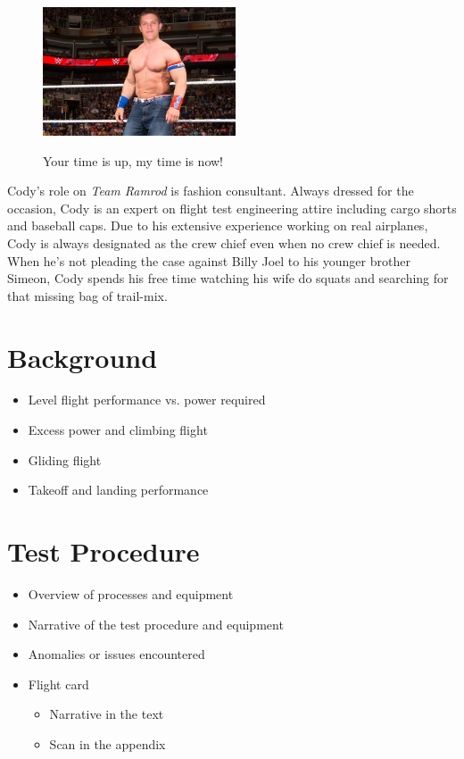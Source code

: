 \documentclass[conf]{new-aiaa}
\begin{document}
\begin{figure}[hbt!]
	\centering
	\includegraphics[height=1.5in]{CodyCena.jpg}
	\label{PAVSLOGO}
	\caption{Your time is up, my time is now!}
\end{figure}

Cody's role on \emph{Team Ramrod} is fashion consultant. Always dressed for the occasion, Cody is an expert on flight test engineering attire including cargo shorts and baseball caps. Due to his extensive experience working on real airplanes, Cody is always designated as the crew chief even when no crew chief is needed. When he's not pleading the case against Billy Joel to  his younger brother Simeon, Cody spends his free time watching his wife do squats and searching for that missing bag of trail-mix.


\section{Background}

\begin{itemize}
	\item Level flight performance vs. power required
	\item Excess power and climbing flight
	\item Gliding flight
	\item Takeoff and landing performance
\end{itemize}

\section{Test Procedure}

\begin{itemize}
	\item Overview of processes and equipment
	\item Narrative of the test procedure and equipment
	\item Anomalies or issues encountered
	\item Flight card
	\begin{itemize}
		\item Narrative in the text
		\item Scan in the appendix
	\end{itemize}
\end{itemize}
\end{document}
